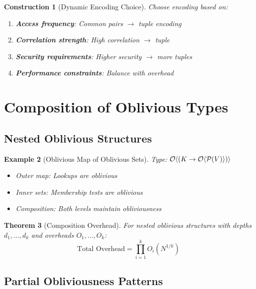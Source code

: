 \documentclass[11pt,final,hidelinks]{article}
\newtheorem{theorem}{Theorem}[section]
\newtheorem{example}[theorem]{Example}
\newtheorem{construction}[theorem]{Construction}
\begin{document}
\begin{construction}[Dynamic Encoding Choice]
Choose encoding based on:
\begin{enumerate}
    \item \textbf{Access frequency}: Common pairs $\to$ tuple encoding
    \item \textbf{Correlation strength}: High correlation $\to$ tuple
    \item \textbf{Security requirements}: Higher security $\to$ more tuples
    \item \textbf{Performance constraints}: Balance with overhead
\end{enumerate}
\end{construction}

\section{Composition of Oblivious Types}

\subsection{Nested Oblivious Structures}

\begin{example}[Oblivious Map of Oblivious Sets]
Type: $\mathcal{O}\langle (K \to \mathcal{O}\langle \mathcal{P}(V) \rangle) \rangle$
\begin{itemize}
    \item Outer map: Lookups are oblivious
    \item Inner sets: Membership tests are oblivious
    \item Composition: Both levels maintain obliviousness
\end{itemize}
\end{example}

\begin{theorem}[Composition Overhead]
For nested oblivious structures with depths $d_1, \ldots, d_k$ and overheads $O_1, \ldots, O_k$:
\begin{equation}
\text{Total Overhead} = \prod_{i=1}^k O_i(N^{1/k})
\end{equation}
\end{theorem}

\subsection{Partial Obliviousness Patterns}
\end{document}
